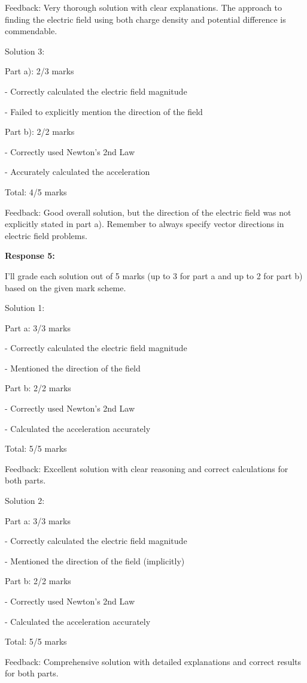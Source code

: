 \documentclass[a4paper,11pt]{article}
\begin{document}
Feedback: Very thorough solution with clear explanations. The approach to finding the electric field using both charge density and potential difference is commendable.

Solution 3:

Part a): 2/3 marks

- Correctly calculated the electric field magnitude

- Failed to explicitly mention the direction of the field

Part b): 2/2 marks

- Correctly used Newton's 2nd Law

- Accurately calculated the acceleration

Total: 4/5 marks

Feedback: Good overall solution, but the direction of the electric field was not explicitly stated in part a). Remember to always specify vector directions in electric field problems.

\bigskip
\textbf{Response 5:}

I'll grade each solution out of 5 marks (up to 3 for part a and up to 2 for part b) based on the given mark scheme.

Solution 1:

Part a: 3/3 marks

- Correctly calculated the electric field magnitude

- Mentioned the direction of the field

Part b: 2/2 marks

- Correctly used Newton's 2nd Law

- Calculated the acceleration accurately

Total: 5/5 marks

Feedback: Excellent solution with clear reasoning and correct calculations for both parts.

Solution 2:

Part a: 3/3 marks

- Correctly calculated the electric field magnitude

- Mentioned the direction of the field (implicitly)

Part b: 2/2 marks

- Correctly used Newton's 2nd Law

- Calculated the acceleration accurately

Total: 5/5 marks

Feedback: Comprehensive solution with detailed explanations and correct results for both parts.
\end{document}
